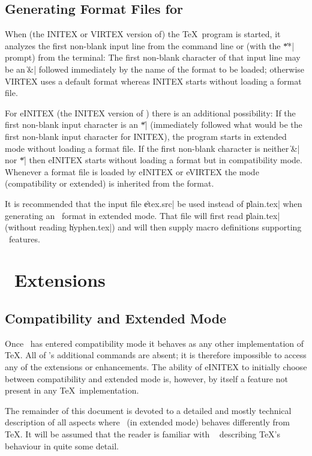 \documentclass[11pt]{article}
\begin{document}
\subsection{Generating Format Files for \eTeX}

When (the INITEX or VIRTEX version of) the \TeX\ program is started, it
analyzes the first non-blank input line from the command line or (with
the \|**| prompt) from the terminal:  The first non-blank character of
that input line may be an \|&| followed immediately by the name of the
format to
be loaded; otherwise VIRTEX uses a default format whereas INITEX starts
without loading a format file.

For eINITEX (the INITEX version of \eTeX) there is an additional
possibility:  If the first non-blank input character is an \|*|
(immediately followed what would be the first non-blank input character
for INITEX), the program starts in extended mode without loading a
format file.  If the first non-blank character is neither \|&| nor \|*|
then eINITEX starts without loading a format but in compatibility mode.
Whenever a format file is loaded by eINITEX or eVIRTEX the mode
(compatibility or extended) is inherited from the format.

It is recommended that the input file \|etex.src| be used instead of
\|plain.tex| when generating an \eTeX\ format in extended mode.  That
file will first read \|plain.tex| (without reading \|hyphen.tex|) and
will then supply macro definitions supporting \eTeX\ features.

\section{\eTeX\ Extensions}

\subsection{Compatibility and Extended Mode}

Once \eTeX\ has entered compatibility mode it behaves as any other
implementation of \TeX.  All of \eTeX's additional commands are absent;
it is therefore impossible to access any of the extensions or
enhancements.  The ability of eINITEX to initially choose between
compatibility and extended mode is, however, by itself a feature not
present in any \TeX\ implementation.

The remainder of this document is devoted to a detailed and mostly
technical description of all aspects where \eTeX\ (in extended mode)
behaves differently from \TeX. It will be assumed that the reader is
familiar with \TeXbook\ \cite{texbook} describing \TeX's behaviour in
quite some detail.
\end{document}
